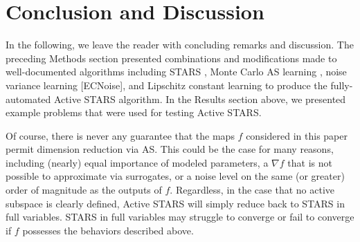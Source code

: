 \documentclass{amsart}
\begin{document}
\section{Conclusion and Discussion}

In the following, we leave the reader with concluding remarks and discussion. The preceding Methods section presented combinations and modifications made to well-documented algorithms including STARS \cite{CW}, Monte Carlo AS learning \cite{ConstantineMC}, noise variance learning [ECNoise], and Lipschitz constant learning \cite{Calliess} to produce the fully-automated Active STARS algorithm. In the Results section above, we presented example problems that were used for testing Active STARS.

Of course, there is never any guarantee that the maps $f$ considered in this paper permit dimension reduction via AS. This could be the case for many reasons, including (nearly) equal importance of modeled parameters, a $\nabla f$ that is not possible to approximate via surrogates, or a noise level on the same (or greater) order of magnitude as the outputs of $f$. Regardless, in the case that no active subspace is clearly defined, Active STARS will simply reduce back to STARS in full variables. STARS in full variables may struggle to converge or fail to converge if $f$ possesses the behaviors described above.
\end{document}
